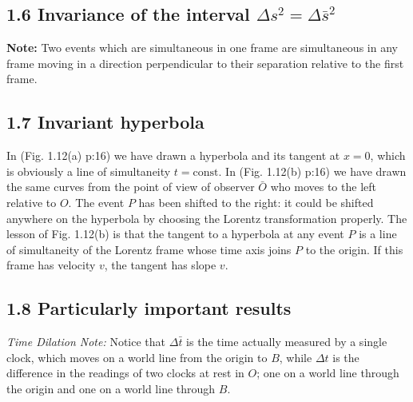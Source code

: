 \documentclass[11pt,letterpaper]{book}
\begin{document}
    \subsection{1.6 Invariance of the interval \(\Delta s^2 = \Delta \bar{ s}^2\) }
        \textbf{Note:} Two events which are simultaneous in one frame are simultaneous in any frame moving in a direction perpendicular to their separation relative to the first frame.
        
    \subsection{1.7 Invariant hyperbola}
        In (Fig. 1.12(a) p:16) we have drawn a hyperbola and its tangent at \( x = 0 \), which is obviously a line of simultaneity \( t = \text{const} \). In (Fig. 1.12(b) p:16) we have drawn the same curves from the point of view of observer \( \bar{O} \) who moves to the left relative to \( O \). The event \( P \) has been shifted to the right: it could be shifted anywhere on the hyperbola by choosing the Lorentz transformation properly. The lesson of Fig. 1.12(b) is that the tangent to a hyperbola at any event \( P \) is a line of simultaneity of the Lorentz frame whose time axis joins \( P \) to the origin. If this frame has velocity \( v \), the tangent has slope \( v \).
    \subsection{1.8 Particularly important results}
        \textit{Time Dilation Note:} Notice that \( \Delta \bar{t} \) is the time actually measured by a single clock, which moves on a world line from the origin to \( B \), while \( \Delta t \) is the difference in the readings of two clocks at rest in \( O \); one on a world line through the origin and one on a world line through \( B \).
        
\end{document}
